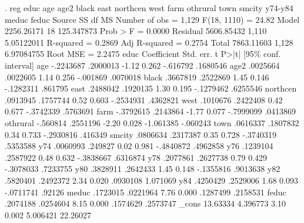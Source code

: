 . reg educ age age2 black east northcen west farm othrural town smcity y74-y84 meduc feduc
{\smallskip}
      Source {\VBAR}       SS           df       MS      Number of obs   =     1,129
   F(18, 1110)     =     24.82
       Model {\VBAR}  2256.26171        18  125.347873   Prob > F        =    0.0000
    Residual {\VBAR}  5606.85432     1,110  5.05122011   R-squared       =    0.2869
   Adj R-squared   =    0.2754
       Total {\VBAR}  7863.11603     1,128  6.97084755   Root MSE        =    2.2475
{\smallskip}
        educ {\VBAR} Coefficient  Std. err.      t    P>|t|     [95\% conf. interval]
         age {\VBAR}  -.2243687   .2000013    -1.12   0.262     -.616792    .1680546
        age2 {\VBAR}   .0025664   .0022605     1.14   0.256     -.001869    .0070018
       black {\VBAR}   .3667819   .2522869     1.45   0.146    -.1282311     .861795
        east {\VBAR}   .2488042   .1920135     1.30   0.195    -.1279462    .6255546
    northcen {\VBAR}   .0913945   .1757744     0.52   0.603    -.2534931    .4362821
        west {\VBAR}   .1010676   .2422408     0.42   0.677    -.3742339    .5763691
        farm {\VBAR}  -.3792615   .2143864    -1.77   0.077    -.7999099    .0413869
    othrural {\VBAR}   -.560814   .2551196    -2.20   0.028    -1.061385    -.060243
        town {\VBAR}   .0616337   .1807832     0.34   0.733    -.2930816     .416349
      smcity {\VBAR}   .0806634   .2317387     0.35   0.728    -.3740319    .5353588
         y74 {\VBAR}   .0060993    .249827     0.02   0.981    -.4840872    .4962858
         y76 {\VBAR}   .1239104   .2587922     0.48   0.632    -.3838667    .6316874
         y78 {\VBAR}   .2077861   .2627738     0.79   0.429    -.3078033    .7233755
         y80 {\VBAR}   .3828911   .2642433     1.45   0.148    -.1355816    .9013638
         y82 {\VBAR}   .5820401   .2492372     2.34   0.020     .0930108    1.071069
         y84 {\VBAR}   .4250429   .2529006     1.68   0.093    -.0711741      .92126
       meduc {\VBAR}   .1723015   .0221964     7.76   0.000     .1287499    .2158531
       feduc {\VBAR}   .2074188   .0254604     8.15   0.000     .1574629    .2573747
       _cons {\VBAR}   13.63334   4.396773     3.10   0.002     5.006421    22.26027
{\smallskip}
